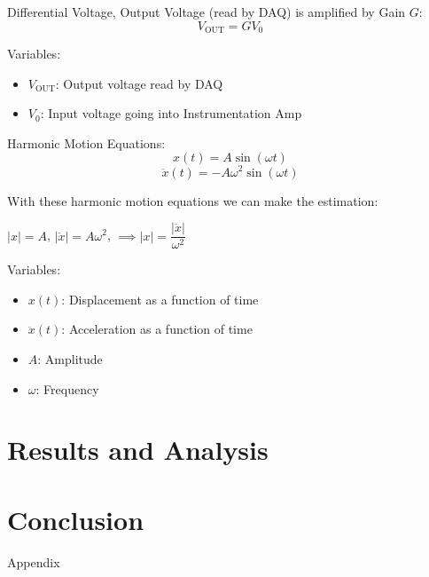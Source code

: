 \documentclass{article}
\begin{document}
Differential Voltage, Output Voltage (read by DAQ) is amplified by Gain $G$:
\begin{equation}
    V_{\text{OUT}} = GV_{0}
\end{equation}

Variables:
\begin{itemize}
    \item \(V_{\text{OUT}}\): Output voltage read by DAQ
    \item \(V_{0}\): Input voltage going into Instrumentation Amp
\end{itemize}
\vspace{5mm}

Harmonic Motion Equations:
\begin{equation}
    x(t) = A\sin{(\omega t)}
\end{equation}
\begin{equation}
    \ddot{x}(t) = -A\omega^{2} \sin{(\omega t)}
\end{equation}

With these harmonic motion equations we can make the estimation:
\begin{center}
    \(|x| = A\), \hspace{10mm} \(|\ddot{x}| = A\omega^{2}\), \hspace{10mm} \(\implies |x| = \dfrac{|\ddot{x}|}{\omega^{2}}\)
\end{center}

Variables:
\begin{itemize}
    \item \(x(t)\): Displacement as a function of time
    \item \(\ddot{x}(t)\): Acceleration as a function of time
    \item \(A\): Amplitude
    \item \(\omega\): Frequency
\end{itemize}
\vspace{5mm}

    
\section{Results and Analysis}


\section{Conclusion}


\newpage
\thispagestyle{empty}  %
\begin{center}
	\vspace*{\fill}
	{\Huge Appendix}
	\vspace*{\fill}
\end{center}
\end{document}
